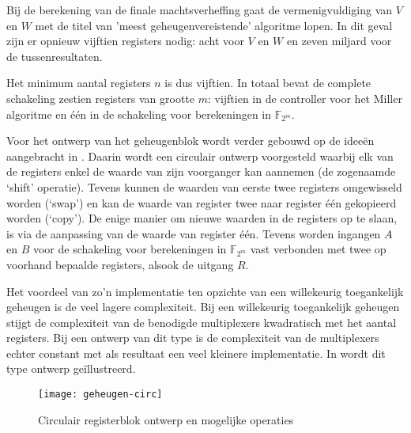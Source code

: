 Bij de berekening van de finale machtsverheffing gaat de vermenigvuldiging van $V$ en $W$ met de titel van 'meest geheugenvereistende' algoritme lopen. In dit geval zijn er opnieuw vijftien registers nodig: acht voor $V$ en $W$ en zeven miljard voor de tussenresultaten.

Het minimum aantal registers $n$ is dus vijftien. In totaal bevat de complete schakeling zestien registers van grootte $m$: vijftien in de controller voor het Miller algoritme en \'e\'en in de schakeling voor berekeningen in $\mathbb{F}_{2^m}$.

Voor het ontwerp van het geheugenblok wordt verder gebouwd op de idee\"en aangebracht in \cite{lee}. Daarin wordt een circulair ontwerp voorgesteld waarbij elk van de registers enkel de waarde van zijn voorganger kan aannemen (de zogenaamde `shift' operatie). Tevens kunnen de waarden van eerste twee registers omgewisseld worden (`swap') en kan de waarde van register twee naar register \'e\'en gekopieerd worden (`copy'). De enige manier om nieuwe waarden in de registers op te slaan, is via de aanpassing van de waarde van register \'e\'en. Tevens worden ingangen $A$ en $B$ voor de schakeling voor berekeningen in $\mathbb{F}_{2^m}$ vast verbonden met twee op voorhand bepaalde registers, alsook de uitgang $R$. 

Het voordeel van zo'n implementatie ten opzichte van een willekeurig toegankelijk geheugen is de veel lagere complexiteit. Bij een willekeurig toegankelijk geheugen stijgt de complexiteit van de benodigde multiplexers kwadratisch met het aantal registers. Bij een ontwerp van dit type is de complexiteit van de multiplexers echter constant met als resultaat een veel kleinere implementatie. In  wordt dit type ontwerp ge\"illustreerd.

\begin{figure}[h]
	\centering
		\texttt{[image: geheugen-circ]}
		\caption{Circulair registerblok ontwerp en mogelijke operaties\label{figuur-implementatie-miller-geheugen-circ}}
\end{figure}


